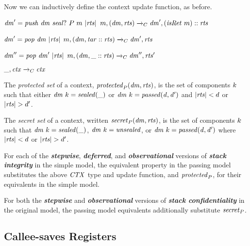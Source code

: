 \documentclass[acmsmall,review,anonymous]{acmart}\settopmatter{printfolios=true,printccs=false,printacmref=false}
\begin{document}
{{Now we can inductively define the context update function, as before.

            {\(\mathit{dm}' = \mathit{push} ~ \mathit{dm} ~ \mathit{seal?} ~ P ~ m ~ |\mathit{rts}|\)}
            {\(m,(\mathit{dm},\mathit{rts}) \xrightarrow{}_C \mathit{dm}',(\mathit{isRet} ~ m)::\mathit{rts}\)}

\vspace*{-1ex}
            {\(\mathit{dm}' = \mathit{pop} ~ \mathit{dm} ~ |\mathit{rts}|\)}
            {\(m,(\mathit{dm},\mathit{tar}::\mathit{rts}) \xrightarrow{}_C \mathit{dm}',\mathit{rts}\)}

\vspace*{-1ex}
              {\(\mathit{dm}'' = \mathit{pop} ~ \mathit{dm}' ~ |\mathit{rts}|\)}
              {\(m,(\mathit{dm},\mbox{\_}::\mathit{rts}) \xrightarrow{}_C \mathit{dm}'',\mathit{rts}'\)}

\vspace*{-5ex}
\judgment[ Default]
         {}
         {\(\mbox{\_},\mathit{ctx} \xrightarrow{}_C \mathit{ctx}\)}

 The \emph{protected set} of a context, \(\mathit{protected}_P(\mathit{dm},\mathit{rts})\),
is the set of components \(k\) such that either \(\mathit{dm} ~ k = \mathit{sealed(\mbox{\_})}\)
or \(\mathit{dm} ~ k = \mathit{passed(d,d')}\) and \(|\mathit{rts}| < d\) or
\(|\mathit{rts}| > d'\).

 The \emph{secret set} of a context, written \(\mathit{secret}_P(\mathit{dm},\mathit{rts})\),
is the set of components \(k\) such that
\(\mathit{dm} ~ k = \mathit{sealed(\mbox{\_})}\), \(\mathit{dm} ~ k = \mathit{unsealed}\), or
\(\mathit{dm} ~ k = \mathit{passed(d,d')}\)
where \(|\mathit{rts}| < d\) or \(|\mathit{rts}| > d'\).

For each of the \textbf{\em stepwise}, \textbf{\em deferred}, and \textbf{\em observational} versions of
\textbf{\em stack integrity} in the simple model, the equivalent property in the
passing model substitutes the above \(\mathit{CTX}\) type and update
function, and \(\mathit{protected}_P\), for their equivalents in the simple model.

For both the \textbf{\em stepwise} and \textbf{\em observational} versions of \textbf{\em stack confidentiality} in
the original model, the passing model equivalents additionally substitute \(\mathit{secret}_P\).

\subsection{Callee-saves Registers}
\label{sec:callee}

}}
\end{document}
